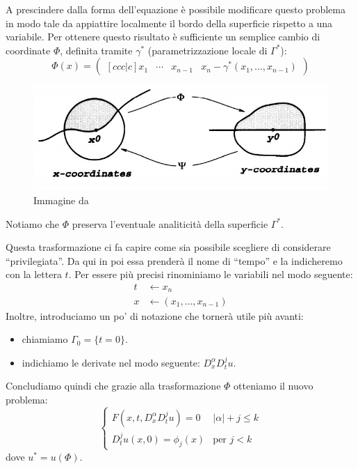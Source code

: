 A prescindere dalla forma dell'equazione è possibile modificare questo problema in modo tale da appiattire localmente il bordo della superficie rispetto a una variabile. Per ottenere questo risultato è sufficiente un semplice cambio di coordinate $\Phi$, definita tramite $\gamma^*$ (parametrizzazione locale di $\Gamma^*$):
$$\Phi (x) = 
\left( \begin{matrix}[ccc|c]
x_1 & \cdots & x_{n-1} & x_n-\gamma^* (x_1,\ldots , x_{n-1})
\end{matrix}\right)$$
\begin{figure}[H]
\centering
\includegraphics[scale=.5]{flatb}
\caption{Immagine da \cite[cap.8]{Evans}}
\end{figure}
\begin{remark}
Notiamo che $\Phi$ preserva l'eventuale analiticità della superficie $\Gamma^*$.
\end{remark}

Questa trasformazione ci fa capire come sia possibile scegliere di considerare  ``privilegiata''. Da qui in poi essa prenderà il nome di ``tempo'' e la indicheremo con la lettera $t$. Per essere più precisi rinominiamo le variabili nel modo seguente:
\begin{align*}
t & \leftarrow x_n \\
x & \leftarrow (x_1,\ldots , x_{n-1})
\end{align*}
Inoltre, introduciamo un po' di notazione che tornerà utile più avanti:
\begin{itemize}
\item chiamiamo $\Gamma_0 = \{t=0\}$.
\item indichiamo le derivate nel modo seguente: $D^\alpha_x D^j_t u$.
\end{itemize}
Concludiamo quindi che grazie alla trasformazione $\Phi$ otteniamo il nuovo problema:
\begin{equation}\label{gamma0prob}
\begin{cases}
F(x,t, D^\alpha_x D^j_t u)=0 & |\alpha | +j \leq k\\
D^j_t u (x,0)= \phi_j(x) & \text{per }j<k 
\end{cases}
\end{equation}
dove $u^*=u(\Phi)$.

